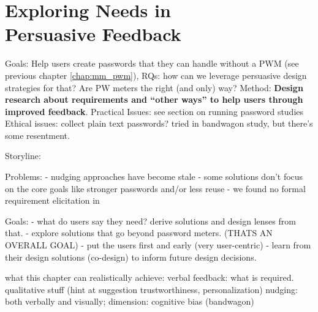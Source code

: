 \chapter[Exploring Needs in Persuasive Feedback] {Exploring Needs in\\ Persuasive Feedback}\label{chap:feedback_modalities}



Goals: Help users create passwords that they can handle without a PWM (see previous chapter \ref{chap:mm_pwm}),
RQs: how can we leverage persuasive design strategies for that? Are PW meters the right (and only) way?
Method: \textbf{Design research about requirements and ``other ways'' to help users through improved feedback}.
Practical Issues: see section on running password studies
Ethical issues: collect plain text passwords? tried in bandwagon study, but there's some resentment. 


Storyline:

Problems:
- nudging approaches have become stale
- some solutions don't focus on the core goals like stronger passwords and/or less reuse
- we found no formal requirement elicitation in 

Goals:
- what do users say they need? derive solutions and design lenses from that. 
- explore solutions that go beyond password meters. (THATS AN OVERALL GOAL)
- put the users first and early (very user-centric)
- learn from their design solutions (co-design) to inform future design decisions.



what this chapter can realistically achieve: 
verbal feedback: what is required. qualitative stuff (hint at suggestion trustworthiness, personalization)
nudging: both verbally and visually; dimension: cognitive bias (bandwagon)



